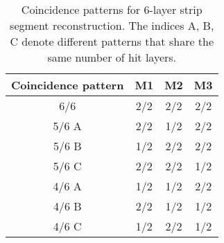 \begin{table}[htbp]
\centering
\small
\caption{Coincidence patterns for 6-layer strip segment reconstruction. The indices A, B, C denote different patterns that share the same number of hit layers.}
\label{tab:strip_coin}
\begin{tabular}{c|ccc}
\hline
\textbf{Coincidence pattern} & \textbf{M1} & \textbf{M2} & \textbf{M3} \\
\hline
6/6       & 2/2 & 2/2 & 2/2 \\
5/6 A     & 2/2 & 1/2 & 2/2 \\
5/6 B     & 1/2 & 2/2 & 2/2 \\
5/6 C     & 2/2 & 2/2 & 1/2 \\
4/6 A     & 1/2 & 1/2 & 2/2 \\
4/6 B     & 2/2 & 1/2 & 1/2 \\
4/6 C     & 1/2 & 2/2 & 1/2 \\
\hline
\end{tabular}
\end{table}